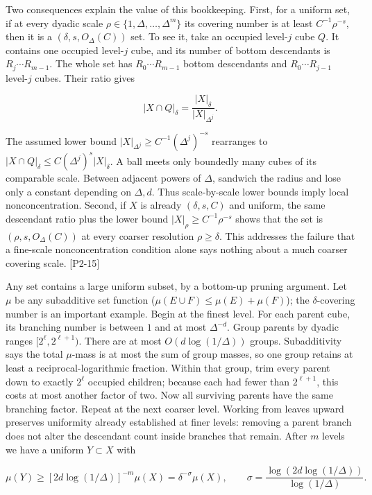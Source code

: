 Two consequences explain the value of this bookkeeping. First, for a uniform set, if at every dyadic scale \(\rho\in\{1,\Delta,\ldots,\Delta^m\}\) its covering number is at least \(C^{-1}\rho^{-s}\), then it is a \((\delta,s,O_\Delta(C))\) set. To see it, take an occupied level-\(j\) cube \(Q\). It contains one occupied level-\(j\) cube, and its number of bottom descendants is \(R_j\cdots R_{m-1}\). The whole set has \(R_0\cdots R_{m-1}\) bottom descendants and \(R_0\cdots R_{j-1}\) level-\(j\) cubes. Their ratio gives

\[|X\cap Q|_\delta=\frac{|X|_\delta}{|X|_{\Delta^j}}.\]

The assumed lower bound \(|X|_{\Delta^j}\ge C^{-1}(\Delta^j)^{-s}\) rearranges to \(|X\cap Q|_\delta\le C(\Delta^j)^s|X|_\delta\). A ball meets only boundedly many cubes of its comparable scale. Between adjacent powers of \(\Delta\), sandwich the radius and lose only a constant depending on \(\Delta,d\). Thus scale-by-scale lower bounds imply local nonconcentration. Second, if \(X\) is already \((\delta,s,C)\) and uniform, the same descendant ratio plus the lower bound \(|X|_\rho\ge C^{-1}\rho^{-s}\) shows that the set is \((\rho,s,O_\Delta(C))\) at every coarser resolution \(\rho\ge\delta\). This addresses the failure that a fine-scale nonconcentration condition alone says nothing about a much coarser covering scale. {[}P2-15{]}

Any set contains a large uniform subset, by a bottom-up pruning argument. Let \(\mu\) be any subadditive set function (\(\mu(E\cup F)\le\mu(E)+\mu(F)\)); the \(\delta\)-covering number is an important example. Begin at the finest level. For each parent cube, its branching number is between \(1\) and at most \(\Delta^{-d}\). Group parents by dyadic ranges \([2^\ell,2^{\ell+1})\). There are at most \(O(d\log(1/\Delta))\) groups. Subadditivity says the total \(\mu\)-mass is at most the sum of group masses, so one group retains at least a reciprocal-logarithmic fraction. Within that group, trim every parent down to exactly \(2^\ell\) occupied children; because each had fewer than \(2^{\ell+1}\), this costs at most another factor of two. Now all surviving parents have the same branching factor. Repeat at the next coarser level. Working from leaves upward preserves uniformity already established at finer levels: removing a parent branch does not alter the descendant count inside branches that remain. After \(m\) levels we have a uniform \(Y\subset X\) with

\[\mu(Y)\ge [2d\log(1/\Delta)]^{-m}\mu(X)=\delta^{-\sigma}\mu(X),\qquad \sigma=\frac{\log(2d\log(1/\Delta))}{\log(1/\Delta)}.\]


